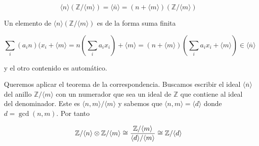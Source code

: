 \documentclass[./ejercicios.tex]{subfiles}
\begin{document}
\begin{equation}
  \langle n \rangle  (\mathbb{Z}/ \langle m \rangle) = \langle \bar n \rangle = (n+\langle m  \rangle) ( \mathbb Z / \langle m\rangle )
\end{equation}

Un elemento de $\langle n \rangle  (\mathbb{Z}/ \langle m \rangle) $ es de la forma suma finita

\begin{equation}
\sum_i (a_i n ) (x_i + \langle m \rangle  = n(  \sum_i a_i x_i) + \langle m \rangle  = (n+ \langle m \rangle)  ( \sum_i a_i x_i + \langle m \rangle) \in \langle \overline n \rangle
\end{equation}

y el otro contenido es automático.

Queremos aplicar el teorema de la correspondencia. Buscamos escribir el ideal $\langle \overline{n} \rangle $ del anillo ${ \mathbb Z}/ \langle m \rangle$ con un numerador que sea un ideal de ${ \mathbb Z}$ que contiene al ideal del denominador. Este es $\langle n,m \rangle / \langle m \rangle$ y sabemos que $\langle n,m \rangle = \langle d \rangle$ donde $d= \gcd(n,m)$. Por tanto

\begin{equation}
  \mathbb{Z}/\langle n\rangle \otimes \mathbb{Z} / \langle m \rangle \cong \frac{\mathbb{Z} / \langle m \rangle }{ \langle d \rangle / \langle m\rangle } \cong \mathbb{Z} / \langle d \rangle
\end{equation}
\end{document}
